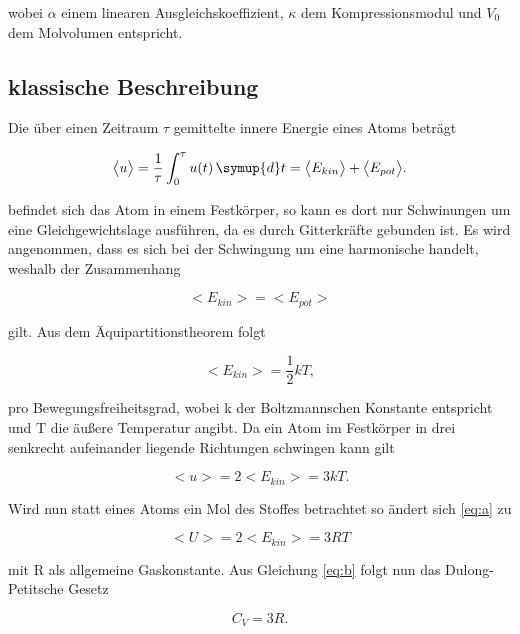 wobei $\alpha$ einem linearen Ausgleichskoeffizient,
$\kappa$ dem Kompressionsmodul und $V_0$ dem Molvolumen entspricht.




\subsection{klassische Beschreibung}
Die über einen Zeitraum $\tau$ gemittelte innere 
Energie eines Atoms beträgt

\begin{equation}
    \bigl< u\bigr>=\frac{1}{\tau}\int_0^{\tau}u(t)\,\symup{d}t=\bigl< E_{kin}\bigr>+\bigl< E_{pot}\bigr>.
\end{equation}

\noindent befindet sich das Atom in einem Festkörper,
so kann es dort nur Schwinungen um eine Gleichgewichtslage 
ausführen, da es durch Gitterkräfte gebunden ist. Es
wird angenommen, dass es sich bei der Schwingung um eine
harmonische handelt, weshalb der Zusammenhang

\begin{equation}
    \bigl< E_{kin}\bigr>=\bigl< E_{pot}\bigr>
\end{equation}

\noindent gilt. Aus dem Äquipartitionstheorem folgt

\begin{equation}
    \bigl< E_{kin}\bigr>=\frac{1}{2}kT,
\end{equation}

\noindent pro Bewegungsfreiheitsgrad, wobei k der Boltzmannschen Konstante
entspricht und T die äußere Temperatur angibt. Da ein Atom im Festkörper in drei senkrecht aufeinander liegende
Richtungen schwingen kann gilt

\begin{equation}
    \bigl< u\bigr>=2\bigl< E_{kin}\bigr>=3kT.
    \label{eq:a}
\end{equation}

\noindent Wird nun statt eines Atoms ein Mol des Stoffes
betrachtet so ändert sich \ref{eq:a} zu

\begin{equation}
    \bigl< U\bigr>=2\bigl< E_{kin}\bigr>=3RT
\end{equation}

\noindent mit R als allgemeine Gaskonstante. Aus Gleichung \ref{eq:b}
folgt nun das Dulong-Petitsche Gesetz

\begin{equation}
    C_V=3R.
\end{equation}



